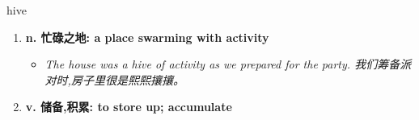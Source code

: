 
\begin{frame}
{\huge hive}
\begin{center}
\begin{enumerate}\Large
  \item \textbf{n. 忙碌之地: a place swarming with activity}
  \begin{itemize}
    \item \em{\Large{The house was a hive of activity as we prepared for the party. 我们筹备派对时,房子里很是熙熙攘攘。}}
  \end{itemize}
  \item \textbf{v. 储备,积累: to store up; accumulate}
\end{enumerate}
\end{center}
\end{frame}
